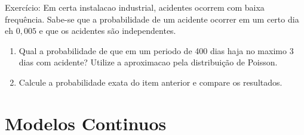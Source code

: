 \begin{description}
\begin{description}
\begin{description}
  \item{Exercício}: Em certa instalacao industrial, acidentes ocorrem com baixa frequência. Sabe-se que 
    a probabilidade de um acidente ocorrer em um certo dia eh $0,005$ e que os acidentes são independentes.
    
    \begin{enumerate}[label=(\alph*)]
      \item Qual a probabilidade de que em um periodo de 400 dias haja no maximo 3 dias com acidente?
      Utilize a aproximacao pela distribuição de Poisson.
    \item Calcule a probabilidade exata do item anterior e compare os resultados.
   \end{enumerate}
  \end{description}
\end{description}
   \end{description}
   \section{Modelos Continuos}
